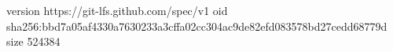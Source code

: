 version https://git-lfs.github.com/spec/v1
oid sha256:bbd7a05af4330a7630233a3cffa02cc304ac9de82efd083578bd27cedd68779d
size 524384
